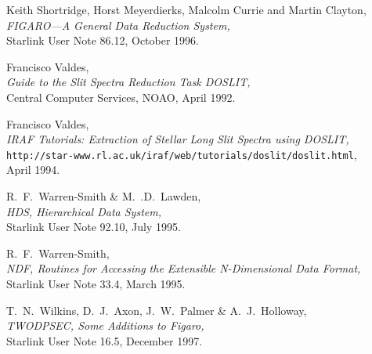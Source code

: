 \documentclass[twoside,11pt]{article}
\newcommand{\htmladdnormallink}[2]{#1}
\newcommand{\xref}[3]{#1}
\newcommand{\scspec}[2]{#1}
\newcommand{\scspec}[2]{#2}
\begin{document}
\begin{thebibliography}{999}
 Keith Shortridge, Horst Meyerdierks, Malcolm Currie and
      Martin Clayton,\\
      {\sl \xref{FIGARO\scspec{---}{ - }A General Data Reduction System}
      {sun86}{},}\\
      Starlink User Note 86.12, October 1996.

 Francisco Valdes,\\
      {\sl
      \htmladdnormallink{Guide to the Slit Spectra Reduction Task DOSLIT}
      {ftp://starlink-ftp.rl.ac.uk/pub/iraf/iraf/docs/doslit.ps.Z},}\\
      Central Computer Services, NOAO, April 1992.

 Francisco Valdes,\\
      {\sl
      \htmladdnormallink{IRAF Tutorials: Extraction of Stellar Long Slit
      Spectra using DOSLIT}
      {http://star-www.rl.ac.uk/iraf/web/tutorials/doslit/doslit.html},}\\
      {\tt http://star-www.rl.ac.uk/iraf/web/tutorials/doslit/doslit.html},
      \\
      April 1994.

 R.~F.~Warren-Smith \& M.~.D.~Lawden,\\
      {\sl \xref{HDS, Hierarchical Data System}{sun92}{},}\\
      Starlink User Note 92.10, July 1995.

 R.~F.~Warren-Smith,\\
      {\sl \xref{NDF, Routines for Accessing the Extensible N-Dimensional
      Data Format}{sun33}{},}\\
      Starlink User Note 33.4, March 1995.

 T.~N.~Wilkins, D.~J.~Axon, J.~W.~Palmer \& A.~J.~Holloway,\\
      {\sl \xref{TWODPSEC, Some Additions to Figaro}{sun16}{},}\\
      Starlink User Note 16.5, December  1997.

\end{thebibliography}
\end{document}
